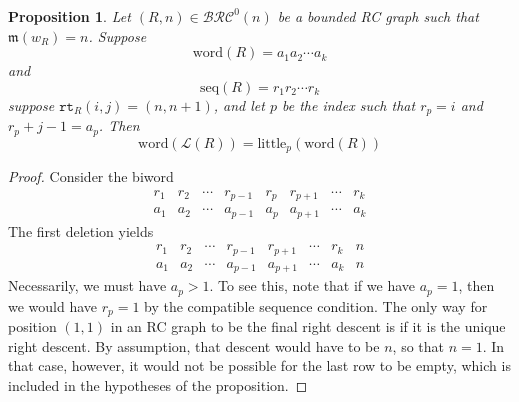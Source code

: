\documentclass{amsart}
\newtheorem{proposition}[lemma]{Proposition}
\theoremstyle{definition}
\theoremstyle{remark}
\numberwithin{equation}{subsection}
\newcommand{\wof}[1]{w_{#1}}
\newcommand{\rtt}{\mathtt{rt}}
\newcommand{\BRC}{\mathcal{BRC}}
\newcommand{\lmap}{\mathscr{L}}
\newcommand{\ltb}{\mathrm{little}}
\newcommand{\maxd}{\mathfrak{m}}
\begin{document}
\begin{proposition} \label{proposition:little_bump}
  Let $(R, n)\in \BRC^0(n)$ be a bounded RC graph such that $\maxd(\wof{R}) = n$. Suppose 
  $$\mathrm{word}(R) = a_1 a_2 \cdots a_k$$ 
  and 
  $$\mathrm{seq}(R) = r_1 r_2 \cdots r_k$$ 
  suppose $\rtt_R(i,j)=(n,n+1)$, and let $p$ be the index such that $r_p=i$ and $r_p + j - 1 = a_p$. Then
  $$\mathrm{word}(\lmap(R)) = \ltb_{p}(\mathrm{word}(R))$$
\end{proposition}
\begin{proof}
Consider the biword
$$\begin{matrix}
r_1& r_2& \cdots & r_{p-1} & r_p & r_{p+1} & \cdots & r_k\\
a_1& a_2& \cdots & a_{p-1} & a_p & a_{p+1} & \cdots & a_k
\end{matrix}$$
The first deletion yields
$$\begin{matrix}
r_1& r_2& \cdots & r_{p-1} &  r_{p+1} & \cdots & r_k& n\\
a_1& a_2& \cdots & a_{p-1} &  a_{p+1} & \cdots & a_k& n
\end{matrix}$$
Necessarily, we must have $a_p > 1$. To see this, note that if we have $a_p=1$, then we would have $r_p=1$ by the compatible sequence condition. The only way for position $(1,1)$ in an RC graph to be the final right descent is if it is the unique right descent. By assumption, that descent would have to be $n$, so that $n=1$. In that case, however, it would not be possible for the last row to be empty, which is included in the hypotheses of the proposition.


\end{proof}
\end{document}
